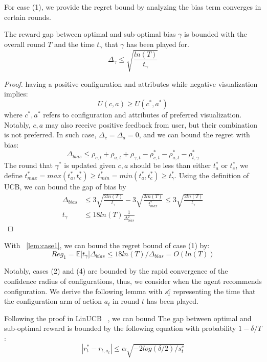 For case (1), we provide the regret bound by analyzing the bias term converges in certain rounds.
\begin{lemma}
    The reward gap between optimal and sub-optimal bias $\gamma$ is bounded with the overall round $T$ and the time $t_\gamma$ that $\gamma$ has been played for.
    \begin{equation}
        \Delta_\gamma \leq \sqrt{\frac{ln(T)}{t_\gamma}}
    \end{equation}
    \label{lem:case1}
\end{lemma}
\begin{proof}
    having a positive configuration and attributes while negative visualization implies:
\begin{equation}
    U(c,a)\geq U(c^\ast,a^\ast)
\end{equation}
where $c^\ast, a^\ast$ refers to configuration and attributes of preferred visualization. Notably, $c,a$ may also receive positive feedback from user, but their combination is not preferred. In such case, $\Delta_c=\Delta_a=0$, and we can bound the regret with bias:
\begin{equation}
    \Delta_{bias} \leq \rho_{c,t} +\rho_{a,t}+ \rho_{\gamma,t} - \rho_{c,t}^\ast -\rho_{a,t}^\ast -\rho_{t,\gamma}^\ast
\end{equation}
The round that $\gamma^\ast$ is updated given $c,a$ should be less than either $t_a^\ast$ or $t_c^\ast$, we define $t_{max}^\ast=max(t_a^\ast,t_c^\ast)\geq t_{min}^\ast=min(t_a^\ast,t_c^\ast)\geq t_\gamma^\ast$. Using the definition of UCB, we can bound the gap of bias by
\begin{align}
     \Delta_{bias} &\leq  3\sqrt{\frac{2ln(T)}{t_\gamma}}-3\sqrt{\frac{2ln(T)}{t^\ast_{max}}}\leq  3\sqrt{\frac{2ln(T)}{t_\gamma}} \\
     t_\gamma &\leq 18ln(T) \frac{1}{\Delta_{bias}^2}
\end{align}
\renewcommand\qedsymbol{}
\end{proof}

With ~\ref{lem:case1}, we can bound the regret bound of case (1) by:
\begin{equation}
    Reg_1=\mathbb E\lbrack t_\gamma \rbrack \Delta_{bias}\leq 18ln(T)/\Delta_{bias} = O(ln(T))
\end{equation}

Notably, cases (2) and (4) are bounded by the rapid convergence of the confidence radius of configurations, thus, we consider when the agent recommends configuration. We derive the following lemma with $s^c_t$ representing the time that the configuration arm of action $a_t$ in round $t$ has been played. 
\begin{lemma}
Following the proof in LinUCB ~\cite{chu2011contextual}, we can bound The gap between optimal and sub-optimal reward is bounded by the following equation with probability $1-\delta/T$:
 \begin{equation}
\label{eqn:semi}
    |r_{t}^*- r_{t,a_t}| \leq \alpha \sqrt{-2log(\delta/2)/s^c_t}
\end{equation}
\end{lemma}

